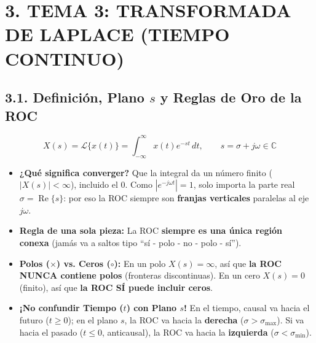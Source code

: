 \documentclass[10pt,a4paper]{article}
\begin{document}
	\section*{3. TEMA 3: TRANSFORMADA DE LAPLACE (TIEMPO CONTINUO)}
	
	\subsection*{3.1. Definición, Plano $s$ y Reglas de Oro de la ROC}
	$$X(s) = \mathcal{L}\{x(t)\} = \int_{-\infty}^{\infty} x(t)e^{-st}\,dt, \qquad s = \sigma + j\omega \in \mathbb{C}$$
	\begin{itemize}
		\item \textbf{¿Qué significa converger?} Que la integral da un número finito ($|X(s)| < \infty$), incluido el $0$. Como $|e^{-j\omega t}| = 1$, solo importa la parte real $\sigma = \operatorname{Re}\{s\}$: por eso la ROC siempre son \textbf{franjas verticales} paralelas al eje $j\omega$.
		\item \textbf{Regla de una sola pieza:} La ROC \textbf{siempre es una única región conexa} (jamás va a saltos tipo ``sí - polo - no - polo - sí'').
		\item \textbf{Polos ($\times$) vs. Ceros ($\circ$):} En un polo $X(s) = \infty$, así que \textbf{la ROC NUNCA contiene polos} (fronteras discontinuas). En un cero $X(s) = 0$ (finito), así que \textbf{la ROC SÍ puede incluir ceros}.
		\item \textbf{¡No confundir Tiempo ($t$) con Plano $s$!} En el tiempo, causal va hacia el futuro ($t \ge 0$); en el plano $s$, la ROC va hacia la \textbf{derecha} ($\sigma > \sigma_{\max}$). Si va hacia el pasado ($t \le 0$, anticausal), la ROC va hacia la \textbf{izquierda} ($\sigma < \sigma_{\min}$).
	\end{itemize}
	
\end{document}

